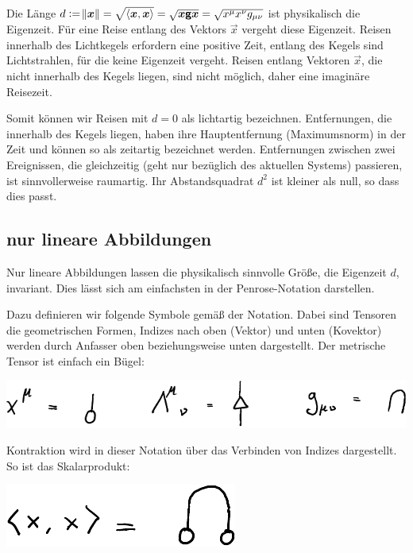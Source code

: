 Die Länge $d := \norm{\boldsymbol{x}} = \sqrt{\left\langle \boldsymbol{x}, \boldsymbol{x} \right\rangle} = \sqrt{\boldsymbol{x}
\boldsymbol{\mathsf{g}} \boldsymbol{x}} = \sqrt{x^\mu x^\nu g_{\mu \nu}}$ ist physikalisch die
Eigenzeit. Für eine Reise entlang des Vektors $\vec x$ vergeht diese Eigenzeit.
Reisen innerhalb des Lichtkegels erfordern eine positive Zeit, entlang des
Kegels sind Lichtstrahlen, für die keine Eigenzeit vergeht. Reisen entlang
Vektoren $\vec x$, die nicht innerhalb des Kegels liegen, sind nicht möglich,
daher eine imaginäre Reisezeit.

Somit können wir Reisen mit $d = 0$ als lichtartig bezeichnen. Entfernungen,
die innerhalb des Kegels liegen, haben ihre Hauptentfernung (Maximumsnorm) in
der Zeit und können so als zeitartig bezeichnet werden. Entfernungen zwischen
zwei Ereignissen, die gleichzeitig (geht nur bezüglich des aktuellen Systems)
passieren, ist sinnvollerweise raumartig. Ihr Abstandsquadrat $d^2$ ist kleiner
als null, so dass dies passt.

\subsection{nur lineare Abbildungen}

Nur lineare Abbildungen lassen die physikalisch sinnvolle Größe, die Eigenzeit
$d$, invariant. Dies lässt sich am einfachsten in der Penrose-Notation
darstellen. \cite{penrose-road_to_reality}

Dazu definieren wir folgende Symbole gemäß der Notation. Dabei sind Tensoren
die geometrischen Formen, Indizes nach oben (Vektor) und unten (Kovektor)
werden durch Anfasser oben beziehungsweise unten dargestellt. Der metrische
Tensor ist einfach ein Bügel:
\begin{center}
	\includegraphics{H1-Definitionen.pdf}
\end{center}

Kontraktion wird in dieser Notation über das Verbinden von Indizes dargestellt.
So ist das Skalarprodukt:
\begin{center}
	\includegraphics{H1-Skalarprodukt.pdf}
\end{center}


